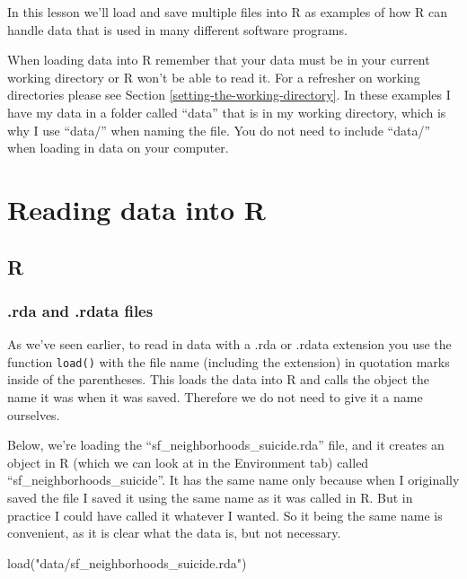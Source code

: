 \documentclass[
  a4paper,
]{krantz}
\makeatletter
\newenvironment{Shaded}{\begin{snugshade}}{\end{snugshade}}
\newcommand{\FunctionTok}[1]{\textcolor[rgb]{0,0,0}{#1}}
\newcommand{\NormalTok}[1]{#1}
\newcommand{\StringTok}[1]{\textcolor[rgb]{0.5,0.5,0.5}{#1}}
\newenvironment{kframe}{%
\medskip{}
\setlength{\fboxsep}{.8em}
 \def\at@end@of@kframe{}%
 \ifinner\ifhmode%
  \def\at@end@of@kframe{\end{minipage}}%
  \begin{minipage}{\columnwidth}%
 \fi\fi%
 \def\FrameCommand##1{\hskip\@totalleftmargin \hskip-\fboxsep
 \colorbox{shadecolor}{##1}\hskip-\fboxsep
     \hskip-\linewidth \hskip-\@totalleftmargin \hskip\columnwidth}%
 \MakeFramed {\advance\hsize-\width
   \@totalleftmargin\z@ \linewidth\hsize
   \@setminipage}}%
 {\par\unskip\endMakeFramed%
 \at@end@of@kframe}
\renewenvironment{Shaded}{\begin{kframe}}{\end{kframe}}
\makeatother
\begin{document}
In this lesson we'll load and save multiple files into R as
examples of how R can handle data that is used in many
different software programs.

When loading data into R remember that your data must be in
your current working directory or R won't be able to read
it. For a refresher on working directories please see
Section \ref{setting-the-working-directory}. In these
examples I have my data in a folder called ``data'' that is
in my working directory, which is why I use ``data/'' when
naming the file. You do not need to include ``data/'' when
loading in data on your computer.

\hypertarget{reading-data-into-r-1}{%
\section{Reading data into R}\label{reading-data-into-r-1}}

\hypertarget{r}{%
\subsection{R}\label{r}}

\hypertarget{rda-and-.rdata-files}{%
\subsubsection{.rda and .rdata
files}\label{rda-and-.rdata-files}}

As we've seen earlier, to read in data with a .rda or .rdata
extension you use the function \texttt{load()} with the file
name (including the extension) in quotation marks inside of
the parentheses. This loads the data into R and calls the
object the name it was when it was saved. Therefore we do
not need to give it a name ourselves.

Below, we're loading the ``sf\_neighborhoods\_suicide.rda''
file, and it creates an object in R (which we can look at in
the Environment tab) called ``sf\_neighborhoods\_suicide''.
It has the same name only because when I originally saved
the file I saved it using the same name as it was called in
R. But in practice I could have called it whatever I wanted.
So it being the same name is convenient, as it is clear what
the data is, but not necessary.

\begin{Shaded}
\begin{Highlighting}[]
\FunctionTok{load}\NormalTok{(}\StringTok{"data/sf\_neighborhoods\_suicide.rda"}\NormalTok{)}
\end{Highlighting}
\end{Shaded}
\end{document}
